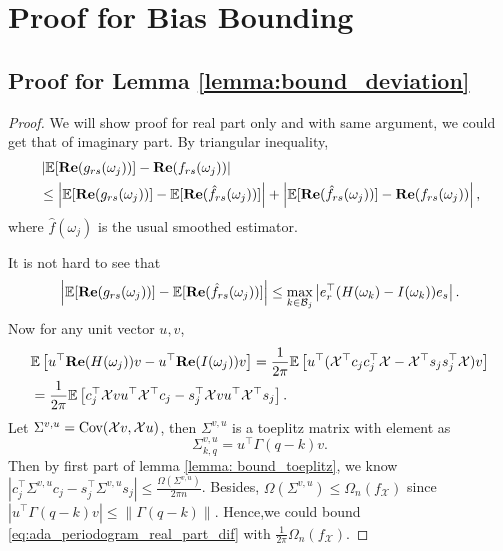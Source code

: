 \section{Proof for Bias Bounding}
\subsection{Proof for Lemma \ref{lemma:bound_deviation}}
\begin{proof}
We will show proof for real part only and with same argument, we could get that of imaginary part. By triangular inequality, 
\begin{equation}
\label{eq:expectation_bias_decomposition}
\begin{aligned}
&\left|\mathbb{E}[{\bf Re}(g_{rs}(\omega_j))] - {\bf Re}(f_{rs}(\omega_j))\right| \\
&\le \left|\mathbb{E}[{\bf Re}(g_{rs}(\omega_j))] - \mathbb{E}[{\bf Re}(\hat{f}_{rs}(\omega_j))] \right| + \left|\mathbb{E}[{\bf Re}(\hat{f}_{rs}(\omega_j))] - {\bf Re}(f_{rs}(\omega_j))\right|,
\end{aligned}
\end{equation}
where $\hat{f}(\omega_j)$ is the usual smoothed estimator. \par 
It is not hard to see that 
\begin{equation}
\left|\mathbb{E}[{\bf Re}(g_{rs}(\omega_j))] - \mathbb{E}[{\bf Re}(\hat{f}_{rs}(\omega_j))] \right| \le \max_{k\in \mathcal{B}_j} \left| e_r^\top   (H(\omega_k) - I(\omega_k)) e_s\right|. 
\end{equation}
Now for any unit vector $u,v$, 
\begin{equation}
\begin{aligned}
\label{eq:ada_periodogram_real_part_dif}
&\mathbb{E} \left [u^\top  {\bf Re}(H(\omega_j))v - u^\top  {\bf Re}(I(\omega_j))v\right] = \frac{1}{2\pi} \mathbb{E}\left[u^\top  (\mathcal{X}^\top  c_jc_j^\top   \mathcal{X} -  \mathcal{X}^\top  s_js_j^\top   \mathcal{X})v\right]\\
&=\frac{1}{2\pi} \mathbb{E}\left[c_j^\top   \mathcal{X}vu^\top  \mathcal{X}^\top   c_j - s_j^\top   \mathcal{X}vu^\top   \mathcal{X}^\top  s_j\right].
\end{aligned}
\end{equation}
Let $\Sigma^{v,u} = \mbox{Cov}(\mathcal{X}v, \mathcal{X}u)$, then $\Sigma^{v,u}$ is a toeplitz matrix with element as 
\begin{equation}
\Sigma^{v,u}_{k,q} = u^\top  \Gamma(q-k)v.
\end{equation}
Then by first part of lemma \ref{lemma: bound_toeplitz}, we know $\left|c_j^\top  \Sigma^{v,u}c_j-s_j^\top  \Sigma^{v,u}s_j\right|\le \frac{\Omega(\Sigma^{v,u})}{2\pi n}$. Besides, $\Omega(\Sigma^{v,u}) \le \Omega_n(f_\mathcal{X})$ since  $\left|u^\top  \Gamma(q-k)v\right| \le \|\Gamma(q-k) \| $. Hence,we could bound \eqref{eq:ada_periodogram_real_part_dif} with $\frac{1}{2\pi} \Omega_n(f_\mathcal{X})$. \par 

\end{proof}

